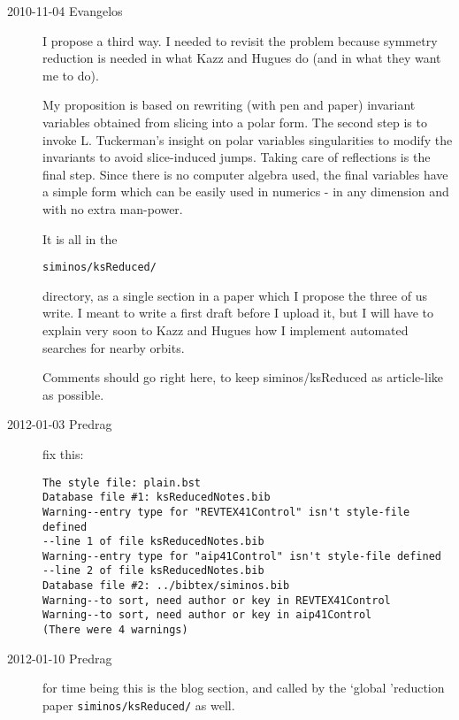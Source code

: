

\begin{description}

\item[2010-11-04 Evangelos]
I propose a third way. I needed to revisit the problem because symmetry
reduction is needed in what Kazz and Hugues do (and in what they want me
to do).

My proposition is based on rewriting (with pen and paper) invariant
variables obtained from slicing into a polar form. The second step is to
invoke L. Tuckerman's insight on polar variables singularities to modify
the invariants to avoid slice-induced jumps. Taking care of reflections
is the final step. Since there is no computer algebra used, the final
variables have a simple form which can be easily used in numerics - in
any dimension and with no extra man-power.

It is all in the
\begin{verbatim}
siminos/ksReduced/
\end{verbatim}
 directory, as a single section in a paper
which I propose the three of us write. I meant to write a first
draft before I upload it, but I will have to explain very soon to Kazz
and Hugues how I implement automated searches for nearby orbits.

Comments should go right here, to keep siminos/ksReduced as
article-like as possible.

\item[2012-01-03 Predrag] fix this:
\begin{verbatim}
The style file: plain.bst
Database file #1: ksReducedNotes.bib
Warning--entry type for "REVTEX41Control" isn't style-file defined
--line 1 of file ksReducedNotes.bib
Warning--entry type for "aip41Control" isn't style-file defined
--line 2 of file ksReducedNotes.bib
Database file #2: ../bibtex/siminos.bib
Warning--to sort, need author or key in REVTEX41Control
Warning--to sort, need author or key in aip41Control
(There were 4 warnings)
\end{verbatim}

\item[2012-01-10 Predrag] for time being this is the blog section, and
called by the `global 'reduction paper \texttt{siminos/ksReduced/} as
well.

\end{description}

